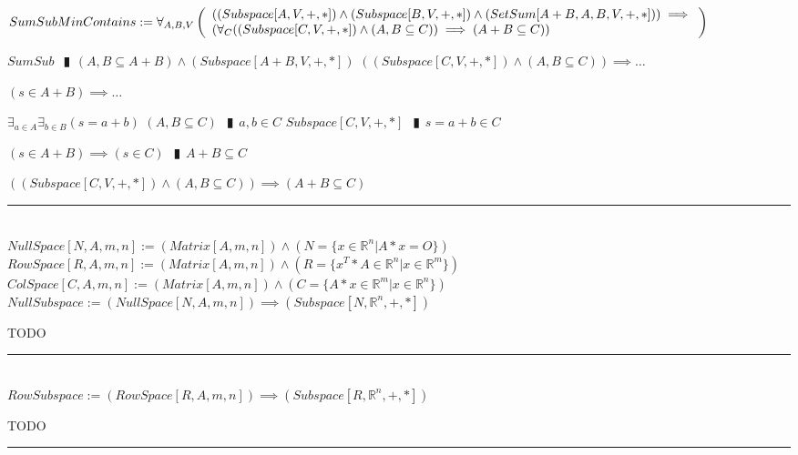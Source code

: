 \documentclass{book}
\newcommand{\abr}{:=}
\newcommand{\pipe}{$\phantom{(}\vrectangleblack\phantom{)}$}
\begin{document}
$SumSubMinContains \abr \forall_{A, B, V}\left(\begin{array}{ll}
  ((Subspace[A, V, +, *]) \land (Subspace[B, V, +, *]) \land (SetSum[A + B, A, B, V, +, *])) \hfill \implies \hfill \\
  (\forall_{C}((Subspace[C, V, + ,*]) \land (A, B \subseteq C)) \implies (A + B \subseteq C))
\end{array}\right)$
\begin{enumerate}
  \lit $SumSub$ \pipe $(A, B \subseteq A + B) \land (Subspace[A + B, V, + ,*])$
  \lit $((Subspace[C, V, + ,*]) \land (A, B \subseteq C)) \implies \ldots$
  \begin{enumerate}
    \lit $(s \in A + B) \implies \ldots$
    \begin{enumerate}
      \lit $\exists_{a \in A} \exists_{b \in B}(s = a + b)$
      \lit $(A, B \subseteq C)$ \pipe $a, b \in C$
      \lit $Subspace[C, V, + ,*]$ \pipe $s = a + b \in C$
    \end{enumerate}
    \lit $(s \in A + B) \implies (s \in C)$ \pipe $A + B \subseteq C$
  \end{enumerate}
  \lit $((Subspace[C, V, + ,*]) \land (A, B \subseteq C)) \implies (A + B \subseteq C)$
\end{enumerate} \vspace{.75mm} \hrule \vspace{.75mm} \ \\ 

$NullSpace[N, A, m, n] \abr (Matrix[A, m, n]) \land (N = \{x \in \mathbb{R}^n | A * x = O\})$ \\  %
$RowSpace[R, A, m, n] \abr (Matrix[A, m, n]) \land (R = \{x^T * A \in \mathbb{R}^n | x \in \mathbb{R}^m\})$ \\  %
$ColSpace[C, A, m, n] \abr (Matrix[A, m, n]) \land (C = \{A * x \in \mathbb{R}^m | x \in \mathbb{R}^n\})$ \\  %

$NullSubspace \abr (NullSpace[N, A, m, n]) \implies (Subspace[N, \mathbb{R}^n, +, *])$
\begin{enumerate}
  \lit TODO
\end{enumerate} \vspace{.75mm} \hrule \vspace{.75mm} \ \\ 

$RowSubspace \abr (RowSpace[R, A, m, n]) \implies (Subspace[R, \mathbb{R}^n, +, *])$
\begin{enumerate}
  \lit TODO
\end{enumerate} \vspace{.75mm} \hrule \vspace{.75mm} \ \\ 
\end{document}
